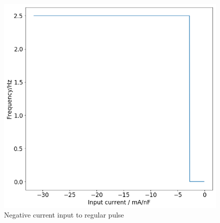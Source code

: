 \documentclass[twoside,twocolumn]{article}
\begin{document}
\twocolumn
\begin{figure}[h]
  \centering
    \includegraphics[width=\linewidth]{negr}
  \caption{Negative current input to regular pulse}
  \label{fig:2d2}
\end{figure}



\end{document}
